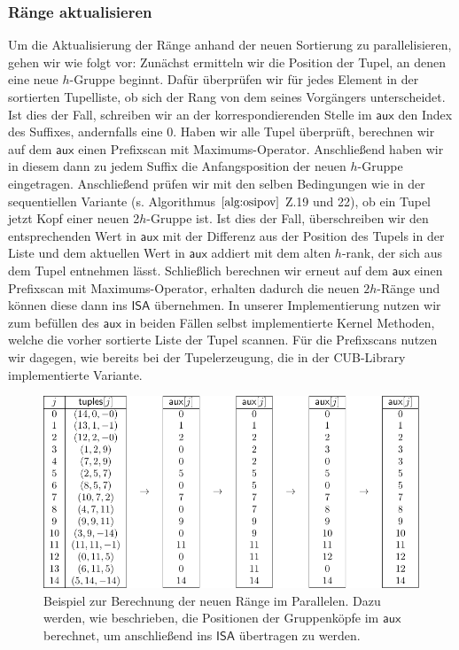\subsubsection{Ränge aktualisieren}
Um die Aktualisierung der Ränge anhand der neuen Sortierung zu parallelisieren, gehen wir wie folgt vor:
Zunächst ermitteln wir die Position der Tupel, an denen eine neue $h$-Gruppe beginnt. Dafür überprüfen wir für jedes Element in der sortierten Tupelliste, ob sich der Rang von dem seines Vorgängers unterscheidet. Ist dies der Fall, schreiben wir an der korrespondierenden Stelle im $\mathsf{aux}$ den Index des Suffixes, andernfalls eine 0. Haben wir alle Tupel überprüft, berechnen wir auf dem $\mathsf{aux}$ einen Prefixscan mit Maximums-Operator. Anschließend haben wir in diesem dann zu jedem Suffix die Anfangsposition der neuen $h$-Gruppe eingetragen. 
Anschließend prüfen wir mit den selben Bedingungen wie in der sequentiellen Variante (s. Algorithmus $\ref{alg:osipov}$ Z.19 und 22), ob ein Tupel jetzt Kopf einer neuen 2$h$-Gruppe ist. Ist dies der Fall, überschreiben wir den entsprechenden Wert in $\mathsf{aux}$ mit der Differenz aus der Position des Tupels in der Liste und dem aktuellen Wert in $\mathsf{aux}$ addiert mit dem alten $h$-rank, der sich aus dem Tupel entnehmen lässt. Schließlich berechnen wir erneut auf dem $\mathsf{aux}$ einen Prefixscan mit Maximums-Operator, erhalten dadurch die neuen $2h$-Ränge und können diese dann ins $\mathsf{ISA}$ übernehmen.
In unserer Implementierung nutzen wir zum befüllen des $\mathsf{aux}$ in beiden Fällen selbst implementierte Kernel Methoden, welche die vorher sortierte Liste der Tupel scannen. Für die Prefixscans nutzen wir dagegen, wie bereits bei der Tupelerzeugung, die in der CUB-Library implementierte Variante.
\begin{center}
\begin{figure}
\includegraphics[scale=0.9]{kapitel/saca_algorithmen/osipov/update_ranks_example.pdf}
\caption{Beispiel zur Berechnung der neuen Ränge im Parallelen. Dazu werden, wie beschrieben, die Positionen der Gruppenköpfe im $\mathsf{aux}$ berechnet, um anschließend ins $\mathsf{ISA}$ übertragen zu werden.}
\end{figure}

\end{center}